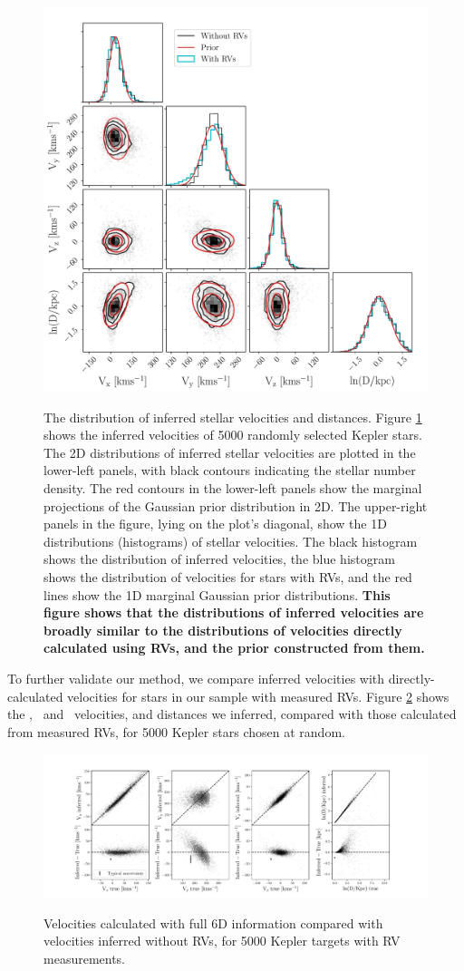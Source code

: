 \begin{figure}[ht!]
\caption{
The distribution of inferred stellar velocities and distances.
    Figure \ref{fig:results} shows the inferred velocities of 5000 randomly
selected Kepler stars.
The 2D distributions of inferred stellar velocities are plotted in the
lower-left panels, with black contours indicating the stellar number density.
The red contours in the lower-left panels show the marginal projections of
    the Gaussian prior distribution in 2D.
The upper-right panels in the figure, lying on the plot's diagonal, show the
    1D distributions (histograms) of stellar velocities.
The black histogram shows the distribution of inferred velocities, the blue
histogram shows the distribution of velocities for stars with RVs,
and the red lines show the 1D marginal Gaussian prior distributions.
{\bf This figure shows that the distributions of inferred velocities are
    broadly similar to the distributions of velocities directly calculated
    using RVs, and the prior constructed from them.}
}
  \centering
    \includegraphics[width=.7\textwidth]{results}
\label{fig:results}
\end{figure}
To further validate our method, we compare inferred velocities with
directly-calculated velocities for stars in our sample with measured RVs.
Figure \ref{fig:residuals} shows the \vx, \vy\ and \vz\ velocities, and
distances we inferred, compared with those calculated from measured RVs, for
5000 Kepler stars chosen at random.
\begin{figure}[ht!]
\caption{Velocities calculated with full 6D information compared with
    velocities inferred without RVs, for 5000 Kepler targets with RV
    measurements.}
  \centering
    \includegraphics[width=1\textwidth]{residuals}
\label{fig:residuals}
\end{figure}

